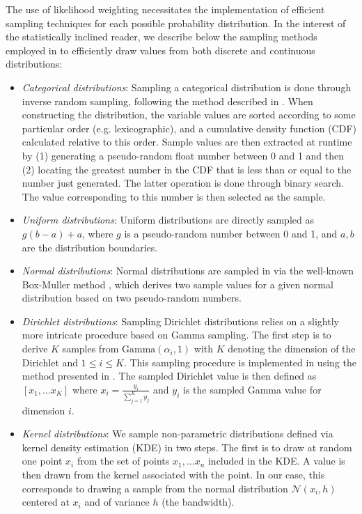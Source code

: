The use of likelihood weighting necessitates the implementation of efficient sampling techniques for each possible probability distribution.  In the interest of the statistically inclined reader, we describe below the sampling methods employed in \opendial to efficiently draw values from both discrete and continuous distributions:
\begin{itemize}
\item \textit{Categorical distributions}:  Sampling a categorical distribution is done through inverse random sampling, following the method described in \cite[][p. 489]{Koller+Friedman:09}. When constructing the distribution, the variable values are sorted according to some particular order (e.g. lexicographic), and a cumulative density function (CDF) calculated relative to this order.  Sample values are then extracted at runtime by (1) generating a pseudo-random float number between 0 and 1 and then (2) locating the greatest number in the CDF that is less than or equal to the number just generated.  The latter operation is done through binary search. The value corresponding to this number is then selected as the sample.
\item \textit{Uniform distributions}:  Uniform distributions are directly sampled as $g (b-a) + a$, where $g$ is a pseudo-random number between 0 and 1, and $a,b$ are the distribution boundaries.

\item \textit{Normal distributions}:  Normal distributions are sampled in \opendial via the well-known Box-Muller method \citep{rBOX58a}, which derives two sample values for a given normal distribution based on two pseudo-random numbers.

\item \textit{Dirichlet distributions}:  Sampling Dirichlet distributions relies on a slightly more intricate procedure based on Gamma sampling.   The first step is to derive $K$ samples from $\mathrm{Gamma} (\alpha_i, 1)$ with $K$ denoting the dimension of the Dirichlet and $1 \leq i \leq K$.  This sampling procedure is implemented in \opendial using the method presented in \cite{cheng1979}.  The sampled Dirichlet value is then defined as $[x_1,...x_K]$ where $x_i = \frac{y_i}{\sum_{j=1}^K y_j}$ and $y_i$ is the sampled Gamma value for dimension $i$.
\item \textit{Kernel distributions}:  We sample non-parametric distributions defined via kernel density estimation (KDE) in two steps. The first is to draw at random one point $x_i$ from the set of points $x_1,...x_n$ included in the KDE. A value is then drawn from the kernel associated with the point. In our case, this corresponds to drawing a sample from the normal distribution $\mathcal{N}(x_i,h)$ centered at $x_i$ and of variance $h$ (the bandwidth). 
\end{itemize}

